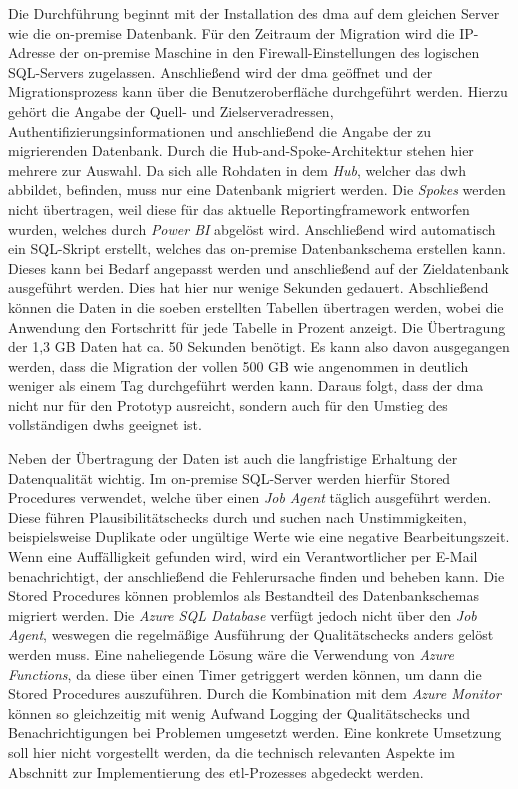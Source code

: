 Die Durchführung beginnt mit der Installation des \ac{dma} auf dem gleichen Server wie die on-premise Datenbank. Für den Zeitraum der Migration wird die IP-Adresse der on-premise Maschine in den Firewall-Einstellungen des logischen SQL-Servers zugelassen. Anschließend wird der \ac{dma} geöffnet und der Migrationsprozess kann über die Benutzeroberfläche durchgeführt werden. Hierzu gehört die Angabe der Quell- und Zielserveradressen, Authentifizierungsinformationen und anschließend die Angabe der zu migrierenden Datenbank. Durch die Hub-and-Spoke-Architektur stehen hier mehrere zur Auswahl. Da sich alle Rohdaten in dem \textit{Hub}, welcher das \ac{dwh} abbildet, befinden, muss nur eine Datenbank migriert werden. Die \textit{Spokes} werden nicht übertragen, weil diese für das aktuelle Reportingframework entworfen wurden, welches durch \textit{Power BI} abgelöst wird. Anschließend wird automatisch ein SQL-Skript erstellt, welches das on-premise Datenbankschema erstellen kann. Dieses kann bei Bedarf angepasst werden und anschließend auf der Zieldatenbank ausgeführt werden. Dies hat hier nur wenige Sekunden gedauert. Abschließend können die Daten in die soeben erstellten Tabellen übertragen werden, wobei die Anwendung den Fortschritt für jede Tabelle in Prozent anzeigt. Die Übertragung der 1,3 GB Daten hat ca. 50 Sekunden benötigt. Es kann also davon ausgegangen werden, dass die Migration der vollen 500 GB wie angenommen in deutlich weniger als einem Tag durchgeführt werden kann. Daraus folgt, dass der \ac{dma} nicht nur für den Prototyp ausreicht, sondern auch für den Umstieg des vollständigen \acp{dwh} geeignet ist.

Neben der Übertragung der Daten ist auch die langfristige Erhaltung der Datenqualität wichtig. Im on-premise SQL-Server werden hierfür Stored Procedures verwendet, welche über einen \textit{Job Agent} täglich ausgeführt werden. Diese führen Plausibilitätschecks durch und suchen nach Unstimmigkeiten, beispielsweise Duplikate oder ungültige Werte wie eine negative Bearbeitungszeit. Wenn eine Auffälligkeit gefunden wird, wird ein Verantwortlicher per E-Mail benachrichtigt, der anschließend die Fehlerursache finden und beheben kann. Die Stored Procedures können problemlos als Bestandteil des Datenbankschemas migriert werden. Die \textit{Azure SQL Database} verfügt jedoch nicht über den \textit{Job Agent}, weswegen die regelmäßige Ausführung der Qualitätschecks anders gelöst werden muss. Eine naheliegende Lösung wäre die Verwendung von \textit{Azure Functions}, da diese über einen Timer getriggert werden können, um dann die Stored Procedures auszuführen. Durch die Kombination mit dem \textit{Azure Monitor} können so gleichzeitig mit wenig Aufwand Logging der Qualitätschecks und Benachrichtigungen bei Problemen umgesetzt werden. Eine konkrete Umsetzung soll hier nicht vorgestellt werden, da die technisch relevanten Aspekte im Abschnitt zur Implementierung des \ac{etl}-Prozesses abgedeckt werden.

